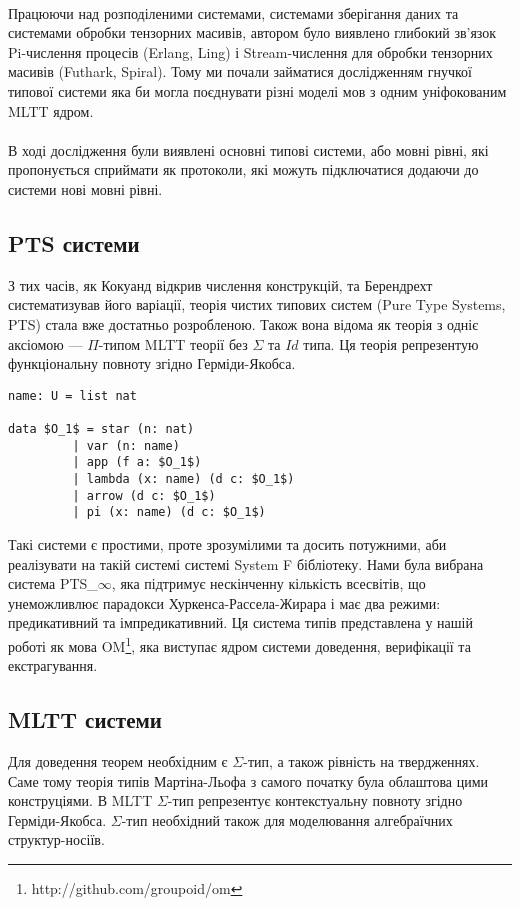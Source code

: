 \paragraph{}
Працюючи над розподіленими системами, системами зберігання даних та
системами обробки тензорних масивів, автором було виявлено глибокий
зв'язок Pi-числення процесів (Erlang, Ling) і Stream-числення для обробки
тензорних масивів (Futhark, Spiral). Тому ми почали займатися дослідженням
гнучкої типової системи яка би могла поєднувати різні моделі мов з одним
уніфокованим MLTT ядром.

\paragraph{}
В ході дослідження були виявлені основні типові системи, або мовні рівні, які
пропонується сприймати як протоколи, які можуть підключатися додаючи до
системи нові мовні рівні.

\subsection{PTS системи}
З тих часів, як Кокуанд відкрив числення конструкцій, та Берендрехт систематизував його варіації,
теорія чистих типових систем (Pure Type Systems, PTS) стала вже достатньо розробленою.
Також вона відома як теорія з одніє аксіомою --- $\Pi$-типом MLTT теорії без $\Sigma$ та $Id$ типа. Ця теорія репрезентую функціональну повноту
згідно Герміди-Якобса.

\begin{lstlisting}[mathescape=true]
name: U = list nat

data $O_1$ = star (n: nat)
         | var (n: name)
         | app (f a: $O_1$)
         | lambda (x: name) (d c: $O_1$)
         | arrow (d c: $O_1$)
         | pi (x: name) (d c: $O_1$)
\end{lstlisting}

Такі системи є простими, проте зрозумілими та досить потужними, аби реалізувати на такій системі
системі System F бібліотеку. Нами була вибрана система PTS_${\infty}$,
яка підтримує нескінченну кількість всесвітів, що унеможливлює парадокси Хуркенса-Рассела-Жирара
і має два режими: предикативний та імпредикативний. Ця система типів представлена
у нашій роботі як мова OM\footnote{http://github.com/groupoid/om},
яка виступає ядром системи доведення, верифікації та екстрагування.

\newpage
\subsection{MLTT системи}
Для доведення теорем необхідним є $\Sigma$-тип, а також рівність на твердженнях.
Саме тому теорія типів Мартіна-Льофа з самого початку була облаштова цими конструціями.
В MLTT $\Sigma$-тип репрезентує контекстуальну повноту згідно Герміди-Якобса.
$\Sigma$-тип необхідний також для моделювання алгебраїчних структур-носіїв.

